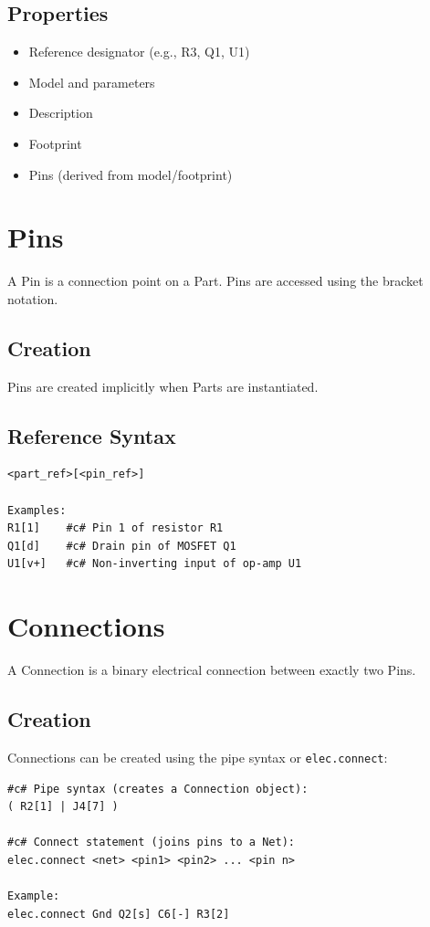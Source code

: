 \subsection{Properties}
\begin{itemize}
\item Reference designator (e.g., R3, Q1, U1)
\item Model and parameters
\item Description
\item Footprint
\item Pins (derived from model/footprint)
\end{itemize}

\section{Pins}
A Pin is a connection point on a Part. Pins are accessed using the bracket notation.

\subsection{Creation}
Pins are created implicitly when Parts are instantiated.

\subsection{Reference Syntax}
\begin{verbatim}
<part_ref>[<pin_ref>]

Examples:
R1[1]    #c# Pin 1 of resistor R1
Q1[d]    #c# Drain pin of MOSFET Q1
U1[v+]   #c# Non-inverting input of op-amp U1
\end{verbatim}

\section{Connections}
A Connection is a binary electrical connection between exactly two Pins.

\subsection{Creation}
Connections can be created using the pipe syntax or \texttt{elec.connect}:
\begin{verbatim}
#c# Pipe syntax (creates a Connection object):
( R2[1] | J4[7] )

#c# Connect statement (joins pins to a Net):
elec.connect <net> <pin1> <pin2> ... <pin n>

Example:
elec.connect Gnd Q2[s] C6[-] R3[2]
\end{verbatim}

